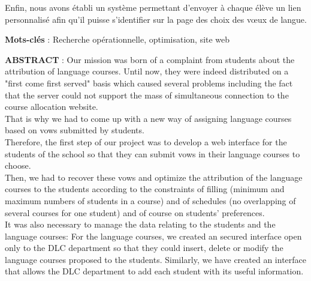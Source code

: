 \documentclass[12pt]{article}
\begin{document}
\begin{center}
\begin{minipage}{16cm}
{{        Enfin, nous avons établi un système permettant d’envoyer à chaque élève un lien personnalisé afin qu’il puisse s’identifier sur la page des choix des vœux de langue. \\
        }
				\par}
		\end{minipage}
		
		\vspace{1cm}
		
		\begin{minipage}{16cm}
			{\normalsize
				\parindent=0pt
				{{\bf Mots-clés} : Recherche opérationnelle, optimisation, site web }
				\par}
		\end{minipage}
		
		
		
		\newpage
		
		\begin{minipage}{16cm}
			{\normalsize
				\parindent=0pt
				{{\bf ABSTRACT} : Our mission was born of a complaint from students about the attribution of language courses. Until now, they were indeed distributed on a  "first come first served" basis which caused several problems including the fact that the server could not support the mass of simultaneous connection to the course allocation website. \\

 
        That is why we had to come up with a new way of assigning language courses based on vows submitted by students. \\
        
         
        Therefore, the first step of our project was to develop a web interface for the students of the school so that they can submit vows in their language courses to choose. \\
        
         
        Then, we had to recover these vows and optimize the attribution of the language courses to the students according to the constraints of filling (minimum and maximum numbers of students in a course) and of schedules (no overlapping of several courses for one student) and of course on students’ preferences. \\
        
         
        It was also necessary to manage the data relating to the students and the language courses: For the language courses, we created an secured interface open only to the DLC department so that they could insert, delete or modify the language courses proposed to the students. Similarly, we have created an interface that allows the DLC department to add each student with its useful information.\\
        
}}
\end{minipage}
\end{center}
\end{document}
